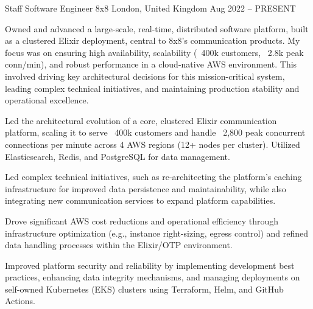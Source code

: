 

\begin{cventries}
  \cventry
    {Staff Software Engineer} %
    {8x8} %
    {London, United Kingdom} %
    {Aug 2022 – PRESENT} %
    {
      \responsibilities %
        {Owned and advanced a large-scale, real-time, distributed software platform, built as a clustered Elixir deployment, central to 8x8's communication products. My focus was on ensuring high availability, scalability (~400k customers, ~2.8k peak conn/min), and robust performance in a cloud-native AWS environment. This involved driving key architectural decisions for this mission-critical system, leading complex technical initiatives, and maintaining production stability and operational excellence.}
      \begin{cvitems} %
        \item {Led the architectural evolution of a core, clustered Elixir communication platform, scaling it to serve ~400k customers and handle ~2,800 peak concurrent connections per minute across 4 AWS regions (12+ nodes per cluster). Utilized Elasticsearch, Redis, and PostgreSQL for data management.}
        \item {Led complex technical initiatives, such as re-architecting the platform's caching infrastructure for improved data persistence and maintainability, while also integrating new communication services to expand platform capabilities.}
        \columnbreak
        \item {Drove significant AWS cost reductions and operational efficiency through infrastructure optimization (e.g., instance right-sizing, egress control) and refined data handling processes within the Elixir/OTP environment.}
        \item {Improved platform security and reliability by implementing development best practices, enhancing data integrity mechanisms, and managing deployments on self-owned Kubernetes (EKS) clusters using Terraform, Helm, and GitHub Actions.}
      \end{cvitems}
    }


\end{cventries}
